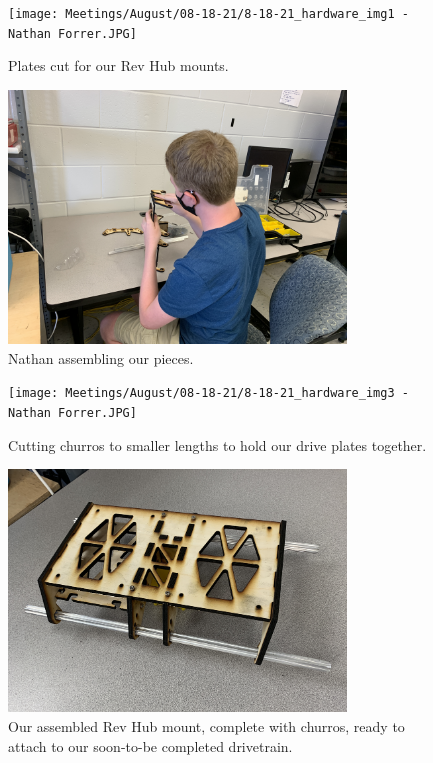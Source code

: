 \begin{figure}[ht]
\centering
\begin{minipage}[b]{.50\textwidth}
  \centering
  \texttt{[image: Meetings/August/08-18-21/8-18-21\_hardware\_img1 - Nathan Forrer.JPG]}
  \caption{Plates cut for our Rev Hub mounts.}
  \label{fig:pic1}
\end{minipage}%
\hfill%
\begin{minipage}[b]{.50\textwidth}
  \centering
  \includegraphics[width=0.8\textwidth]{Meetings/August/08-18-21/8-18-21_hardware_img2 - Nathan Forrer.JPG}
  \caption{Nathan assembling our pieces.}
  \label{fig:pic2}
\end{minipage}
\end{figure}

\begin{figure}[ht]
\centering
\begin{minipage}[b]{.50\textwidth}
  \centering
  \texttt{[image: Meetings/August/08-18-21/8-18-21\_hardware\_img3 - Nathan Forrer.JPG]}
  \caption{Cutting churros to smaller lengths to hold our drive plates together.}
  \label{fig:pic3}
\end{minipage}%
\hfill%
\begin{minipage}[b]{.50\textwidth}
  \centering
  \includegraphics[width=0.8\textwidth]{Meetings/August/08-18-21/8-18-21_hardware_img4 - Nathan Forrer.JPG}
  \caption{Our assembled Rev Hub mount, complete with churros, ready to attach to our soon-to-be completed drivetrain.}
  \label{fig:pic4}
\end{minipage}
\end{figure}